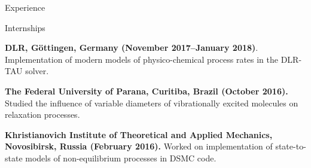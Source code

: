 \documentclass{resume} %
\begin{document}
\begin{rSection}{Experience}
\begin{rSubsection}{Internships}{}{}{}
\item \textbf{DLR, Göttingen, Germany (November 2017--January 2018)}.
Implementation of modern models of physico-chemical process rates in the DLR-TAU solver.

\item \textbf{The Federal University of Parana, Curitiba, Brazil (October 2016).}
Studied the influence of variable diameters of vibrationally excited molecules on relaxation processes.

\item \textbf{Khristianovich Institute of Theoretical and Applied Mechanics, Novosibirsk, Russia (February 2016).}
Worked on implementation of state-to-state models of non-equilibrium processes in DSMC code.
\end{rSubsection}





\end{rSection}
\end{document}
